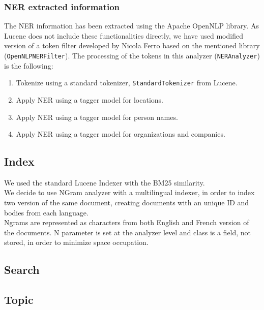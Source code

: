 \subsubsection{NER extracted information}
The NER information has been extracted using the Apache OpenNLP %
library.
As Lucene does not include these functionalities directly, we have used modified version of a token filter developed by
Nicola Ferro based on the mentioned library (\texttt{OpenNLPNERFilter}).
The processing of the tokens in this analyzer (\texttt{NERAnalyzer}) is the following:
\begin{enumerate}
    \item Tokenize using a standard tokenizer, \texttt{StandardTokenizer} from Lucene.
    \item Apply NER using a tagger model for locations.
    \item Apply NER using a tagger model for person names.
    \item Apply NER using a tagger model for organizations and companies.
\end{enumerate}

\subsection{Index}\label{subsec:index}
We used the standard Lucene Indexer with the BM25\cite{BM25} similarity.\\
We decide to use NGram analyzer with a multilingual indexer,
in order to index two version of the same document, creating documents with
an unique ID and bodies from each language.\\
Ngrams are represented as characters from both English and French version of
the documents. N parameter is set at the analyzer level and class is a field,
not stored, in order to minimize space occupation.\\

\subsection{Search}\label{subsec:search}

\subsection{Topic}\label{subsec:topic}